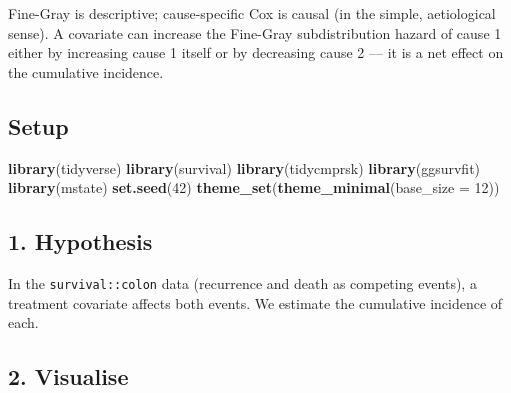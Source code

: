 \documentclass[
]{article}
\newenvironment{Shaded}{\begin{snugshade}}{\end{snugshade}}
\newcommand{\AttributeTok}[1]{\textcolor[rgb]{0.13,0.29,0.53}{#1}}
\newcommand{\DecValTok}[1]{\textcolor[rgb]{0.00,0.00,0.81}{#1}}
\newcommand{\FunctionTok}[1]{\textcolor[rgb]{0.13,0.29,0.53}{\textbf{#1}}}
\newcommand{\NormalTok}[1]{#1}
\begin{document}
Fine-Gray is descriptive; cause-specific Cox is causal (in the simple,
aetiological sense). A covariate can increase the Fine-Gray
subdistribution hazard of cause 1 either by increasing cause 1 itself or
by decreasing cause 2 --- it is a net effect on the cumulative
incidence.

\subsection{Setup}\label{setup}

\begin{Shaded}
\begin{Highlighting}[]
\FunctionTok{library}\NormalTok{(tidyverse)}
\FunctionTok{library}\NormalTok{(survival)}
\FunctionTok{library}\NormalTok{(tidycmprsk)}
\FunctionTok{library}\NormalTok{(ggsurvfit)}
\FunctionTok{library}\NormalTok{(mstate)}
\FunctionTok{set.seed}\NormalTok{(}\DecValTok{42}\NormalTok{)}
\FunctionTok{theme\_set}\NormalTok{(}\FunctionTok{theme\_minimal}\NormalTok{(}\AttributeTok{base\_size =} \DecValTok{12}\NormalTok{))}
\end{Highlighting}
\end{Shaded}

\subsection{1. Hypothesis}\label{hypothesis}

In the \texttt{survival::colon} data (recurrence and death as competing
events), a treatment covariate affects both events. We estimate the
cumulative incidence of each.

\subsection{2. Visualise}\label{visualise}
\end{document}
